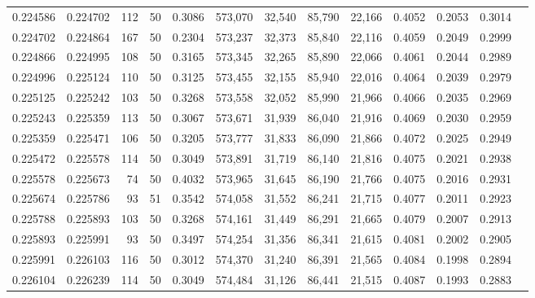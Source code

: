 \begin{tabular}{rrrrrrrrrrrrr}
0.224586 & 0.224702 &   112 &  50 &                                     0.3086 & 573,070 &  32,540 &  85,790 &  22,166 & 0.4052 & 0.2053 & 0.3014 \\
0.224702 & 0.224864 &   167 &  50 &                                     0.2304 & 573,237 &  32,373 &  85,840 &  22,116 & 0.4059 & 0.2049 & 0.2999 \\
0.224866 & 0.224995 &   108 &  50 &                                     0.3165 & 573,345 &  32,265 &  85,890 &  22,066 & 0.4061 & 0.2044 & 0.2989 \\
0.224996 & 0.225124 &   110 &  50 &                                     0.3125 & 573,455 &  32,155 &  85,940 &  22,016 & 0.4064 & 0.2039 & 0.2979 \\
0.225125 & 0.225242 &   103 &  50 &                                     0.3268 & 573,558 &  32,052 &  85,990 &  21,966 & 0.4066 & 0.2035 & 0.2969 \\
0.225243 & 0.225359 &   113 &  50 &                                     0.3067 & 573,671 &  31,939 &  86,040 &  21,916 & 0.4069 & 0.2030 & 0.2959 \\
0.225359 & 0.225471 &   106 &  50 &                                     0.3205 & 573,777 &  31,833 &  86,090 &  21,866 & 0.4072 & 0.2025 & 0.2949 \\
0.225472 & 0.225578 &   114 &  50 &                                     0.3049 & 573,891 &  31,719 &  86,140 &  21,816 & 0.4075 & 0.2021 & 0.2938 \\
0.225578 & 0.225673 &    74 &  50 &                                     0.4032 & 573,965 &  31,645 &  86,190 &  21,766 & 0.4075 & 0.2016 & 0.2931 \\
0.225674 & 0.225786 &    93 &  51 &                                     0.3542 & 574,058 &  31,552 &  86,241 &  21,715 & 0.4077 & 0.2011 & 0.2923 \\
0.225788 & 0.225893 &   103 &  50 &                                     0.3268 & 574,161 &  31,449 &  86,291 &  21,665 & 0.4079 & 0.2007 & 0.2913 \\
0.225893 & 0.225991 &    93 &  50 &                                     0.3497 & 574,254 &  31,356 &  86,341 &  21,615 & 0.4081 & 0.2002 & 0.2905 \\
0.225991 & 0.226103 &   116 &  50 &                                     0.3012 & 574,370 &  31,240 &  86,391 &  21,565 & 0.4084 & 0.1998 & 0.2894 \\
0.226104 & 0.226239 &   114 &  50 &                                     0.3049 & 574,484 &  31,126 &  86,441 &  21,515 & 0.4087 & 0.1993 & 0.2883 \\

\end{tabular}
